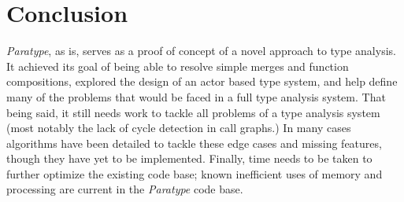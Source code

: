 \documentclass{acm_proc_article-sp}
\begin{document}
%
%
%
%
%
%
%
%
%
%









\section{Conclusion}

\emph{Paratype}, as is, serves as a proof of concept of a novel approach to
type analysis. It achieved its goal of being able to resolve simple merges and
function compositions, explored the design of an actor based type system, and
help define many of the problems that would be faced in a full type analysis
system. That being said, it still needs work to tackle all problems of a type
analysis system (most notably the lack of cycle detection in call graphs.) In
many cases algorithms have been detailed to tackle these edge cases  and
missing features, though they have yet to be implemented. Finally, time needs
to be taken to further optimize the existing code base; known inefficient uses
of memory and processing are current in the \emph{Paratype} code base.
\end{document}
